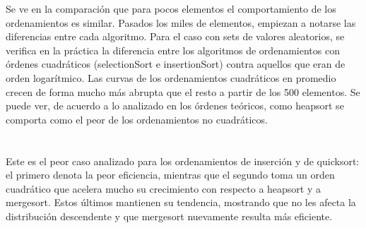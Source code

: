 \documentclass[article,a4paper]{article}
\begin{document}
Se ve en la comparación que para pocos elementos el comportamiento de los ordenamientos es similar. Pasados los miles de elementos, empiezan a notarse las diferencias entre cada algoritmo. Para el caso con sets de valores aleatorios, se verifica en la práctica la diferencia entre los algoritmos de ordenamientos con órdenes cuadráticos (selectionSort e insertionSort) contra aquellos que eran de orden logarítmico. Las curvas de los ordenamientos cuadráticos en promedio crecen de forma mucho más abrupta que el resto a partir de los 500 elementos. Se puede ver, de acuerdo a lo analizado en los órdenes teóricos, como heapsort se comporta como el peor de los ordenamientos no cuadráticos.\\

\\ \\

Este es el peor caso analizado para los ordenamientos de inserción y de quicksort: el primero denota la peor eficiencia, mientras que el segundo toma un orden cuadrático que acelera mucho su crecimiento con respecto a heapsort y a mergesort. Estos últimos mantienen su tendencia, mostrando que no les afecta la distribución descendente y que mergesort nuevamente resulta más eficiente.\\

\\ \\
\end{document}
